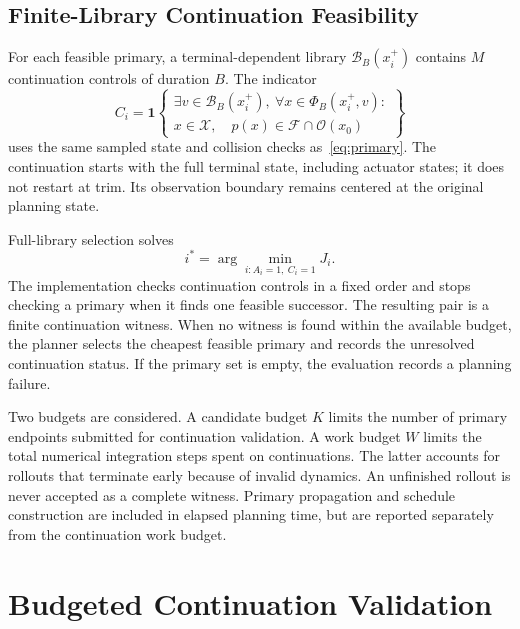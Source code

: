 \subsection{Finite-Library Continuation Feasibility}
For each feasible primary, a terminal-dependent library $\mathcal B_B(x_i^+)$ contains $M$ continuation controls of duration $B$. The indicator
\begin{equation}
 C_i=\mathbf 1\left\{\begin{array}{l}\exists v\in\mathcal B_B(x_i^+),\ \forall x\in\Phi_B(x_i^+,v):\\
 x\in\mathcal X,\quad p(x)\in\mathcal F\cap\mathcal O(x_0)\end{array}\right\}
 \label{eq:continuation}
\end{equation}
uses the same sampled state and collision checks as~\eqref{eq:primary}. The continuation starts with the full terminal state, including actuator states; it does not restart at trim. Its observation boundary remains centered at the original planning state.

Full-library selection solves
\begin{equation}
 i^*=\arg\min_{i:A_i=1,\ C_i=1}J_i. \label{eq:full}
\end{equation}
The implementation checks continuation controls in a fixed order and stops checking a primary when it finds one feasible successor. The resulting pair is a finite continuation witness. When no witness is found within the available budget, the planner selects the cheapest feasible primary and records the unresolved continuation status. If the primary set is empty, the evaluation records a planning failure.

Two budgets are considered. A candidate budget $K$ limits the number of primary endpoints submitted for continuation validation. A work budget $W$ limits the total numerical integration steps spent on continuations. The latter accounts for rollouts that terminate early because of invalid dynamics. An unfinished rollout is never accepted as a complete witness. Primary propagation and schedule construction are included in elapsed planning time, but are reported separately from the continuation work budget.

\section{Budgeted Continuation Validation}
